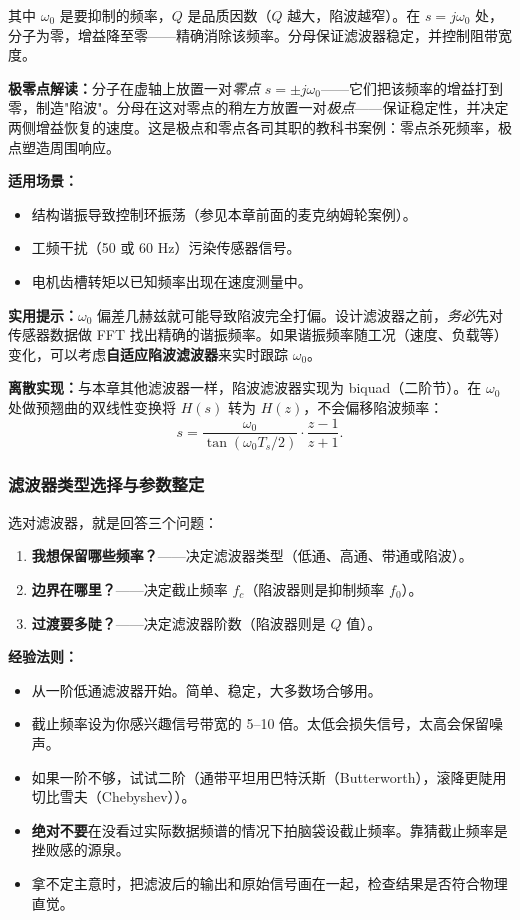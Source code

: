 其中 $\omega_0$ 是要抑制的频率，$Q$ 是品质因数（$Q$ 越大，陷波越窄）。在 $s = j\omega_0$ 处，分子为零，增益降至零——精确消除该频率。分母保证滤波器稳定，并控制阻带宽度。

\textbf{极零点解读：}分子在虚轴上放置一对\textit{零点} $s = \pm j\omega_0$——它们把该频率的增益打到零，制造"陷波"。分母在这对零点的稍左方放置一对\textit{极点}——保证稳定性，并决定两侧增益恢复的速度。这是极点和零点各司其职的教科书案例：零点杀死频率，极点塑造周围响应。

\textbf{适用场景：}
\begin{itemize}[nosep]
    \item 结构谐振导致控制环振荡（参见本章前面的麦克纳姆轮案例）。
    \item 工频干扰（50 或 60 Hz）污染传感器信号。
    \item 电机齿槽转矩以已知频率出现在速度测量中。
\end{itemize}

\textbf{实用提示：}$\omega_0$ 偏差几赫兹就可能导致陷波完全打偏。设计滤波器之前，\textit{务必}先对传感器数据做 FFT 找出精确的谐振频率。如果谐振频率随工况（速度、负载等）变化，可以考虑\textbf{自适应陷波滤波器}来实时跟踪 $\omega_0$。

\textbf{离散实现：}与本章其他滤波器一样，陷波滤波器实现为 biquad（二阶节）。在 $\omega_0$ 处做预翘曲的双线性变换将 $H(s)$ 转为 $H(z)$，不会偏移陷波频率：
\[
s = \frac{\omega_0}{\tan(\omega_0 T_s / 2)} \cdot \frac{z - 1}{z + 1}.
\]

\subsubsection{滤波器类型选择与参数整定}

选对滤波器，就是回答三个问题：
\begin{enumerate}
    \item \textbf{我想保留哪些频率？}——决定滤波器类型（低通、高通、带通或陷波）。
    \item \textbf{边界在哪里？}——决定截止频率 $f_c$（陷波器则是抑制频率 $f_0$）。
    \item \textbf{过渡要多陡？}——决定滤波器阶数（陷波器则是 $Q$ 值）。
\end{enumerate}

\textbf{经验法则：}
\begin{itemize}
    \item 从一阶低通滤波器开始。简单、稳定，大多数场合够用。
    \item 截止频率设为你感兴趣信号带宽的 5--10 倍。太低会损失信号，太高会保留噪声。
    \item 如果一阶不够，试试二阶（通带平坦用巴特沃斯（Butterworth），滚降更陡用切比雪夫（Chebyshev））。
    \item \textbf{绝对不要}在没看过实际数据频谱的情况下拍脑袋设截止频率。靠猜截止频率是挫败感的源泉。
    \item 拿不定主意时，把滤波后的输出和原始信号画在一起，检查结果是否符合物理直觉。
\end{itemize}

